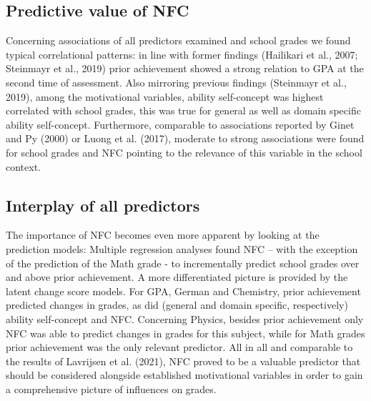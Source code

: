\documentclass[
  man]{apa6}
\begin{document}
\hypertarget{predictive-value-of-nfc}{%
\subsection{Predictive value of NFC}\label{predictive-value-of-nfc}}

Concerning associations of all predictors examined and school grades we found typical correlational patterns: in line with former findings (Hailikari et al., 2007; Steinmayr et al., 2019) prior achievement showed a strong relation to GPA at the second time of assessment. Also mirroring previous findings (Steinmayr et al., 2019), among the motivational variables, ability self-concept was highest correlated with school grades, this was true for general as well as domain specific ability self-concept. Furthermore, comparable to associations reported by Ginet and Py (2000) or Luong et al. (2017), moderate to strong associations were found for school grades and NFC pointing to the relevance of this variable in the school context.

\hypertarget{interplay-of-all-predictors}{%
\subsection{Interplay of all predictors}\label{interplay-of-all-predictors}}

The importance of NFC becomes even more apparent by looking at the prediction models: Multiple regression analyses found NFC -- with the exception of the prediction of the Math grade - to incrementally predict school grades over and above prior achievement. A more differentiated picture is provided by the latent change score models. For GPA, German and Chemistry, prior achievement predicted changes in grades, as did (general and domain specific, respectively) ability self-concept and NFC. Concerning Physics, besides prior achievement only NFC was able to predict changes in grades for this subject, while for Math grades prior achievement was the only relevant predictor. All in all and comparable to the results of Lavrijsen et al. (2021), NFC proved to be a valuable predictor that should be considered alongside established motivational variables in order to gain a comprehensive picture of influences on grades.
\end{document}

